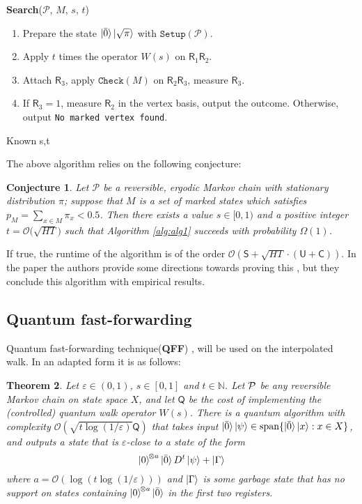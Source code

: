 \documentclass{article}
\newcommand{\eps}{\varepsilon}
\newcommand{\nrm}[1]{\left\lVert #1 \right\rVert}
\newcommand{\bigO}[1]{\mathcal{O}\left( #1 \right)}
\newcommand{\bigObig}[1]{\mathcal{O}\big( #1 \big)}
\newcommand{\PM}{\mathcal{P}}
\newtheorem{theorem}{Theorem}
\newtheorem{conj}[theorem]{Conjecture}
\renewcommand{\check}{\mathtt{Check}}
\newcommand{\setup}{\mathtt{Setup}}
\newcommand{\checkingcost}{\mathsf{C}}
\newcommand{\setupcost}{\mathsf{S}}
\newcommand{\updatecost}{\mathsf{U}}
\newcommand{\Reg}{\mathsf{R}}
\newcommand{\barO}{\bar{0}}
\begin{document}
\begin{algorithm}[H]
	\textbf{Search}($ \PM $, $ M $, $ s $, $ t $) %
	
	\begin{enumerate}
		\item Prepare the state $\ket{\barO}\ket{\sqrt \pi}$ with $ \setup(\PM) $.
		\item Apply $ t $ times  the operator $ W(s) $  on $ \Reg_1 \Reg_2 $.
		\item Attach $ \Reg_3 $, apply $ \check(M) $ on $ \Reg_2 \Reg_3 $, measure $ \Reg_3 $.
		\item If $ \Reg_3=1 $, measure $ \Reg_2 $ in the vertex basis, output the outcome. Otherwise, output \texttt{No marked vertex found}.
	\end{enumerate}
	
	\caption{Known s,t}\label{alg:alg1}
\end{algorithm}
The above algorithm relies on the following conjecture:
\begin{conj}
\label{conj:1}
	Let  $  \PM$ be a reversible, ergodic Markov chain with stationary distribution $\pi$;  suppose that   $ M $ is a set of marked states which  satisfies $p_M= \sum_{x\in M} \pi_x < 0.5 $. Then
	there exists a  value $ s \in [0,1) $ and a positive  integer $ t = \bigObig{\sqrt{HT}} $ such that
	Algorithm \ref{alg:alg1} succeeds with probability $ \Omega(1) $.
\end{conj}
If true, the runtime of the algorithm is of the order $ \bigO {\setupcost + \sqrt{HT} \cdot (\updatecost + \checkingcost)}$. 
In the paper the authors provide some directions towards proving this , but they conclude this algorithm with empirical results.
\subsection{Quantum fast-forwarding}\label{subsec:fast-forwarding}
Quantum fast-forwarding technique(\textbf{QFF}) \cite{Apers2018QuantumFM}, will be used on the interpolated walk. In an adapted form it is as follows:

\begin{theorem}\label{thm:fast-forwarding}
Let $\eps\in(0,1)$, $s\in[0,1]$ and $t\in\mathbb{N}$. Let $\cal P$ be any reversible Markov chain on state space $X$, and let $\mathsf{Q}$ be the cost of implementing the (controlled) quantum walk operator $W(s)$. There is a quantum algorithm with complexity $\bigO{\sqrt{t\log(1/\eps)}\mathsf{Q}}$ that takes input $\ket{\barO}\ket{\psi}\in \mathrm{span}\{\ket{\barO}\ket{x}:x\in X\}$, and outputs a state that is $\eps$-close to a state of the form
$$\ket{0}^{\!\otimes a}\ket{\barO}D^t\ket{\psi}+\ket{\Gamma}$$
where $a=\bigO{\log(t\log(1/\eps))}$ and $\ket{\Gamma}$ is some garbage state that has no support on states containing $\ket{0}^{\!\otimes a}\ket{\barO}$ in the first two registers.%
\end{theorem}
\end{document}
